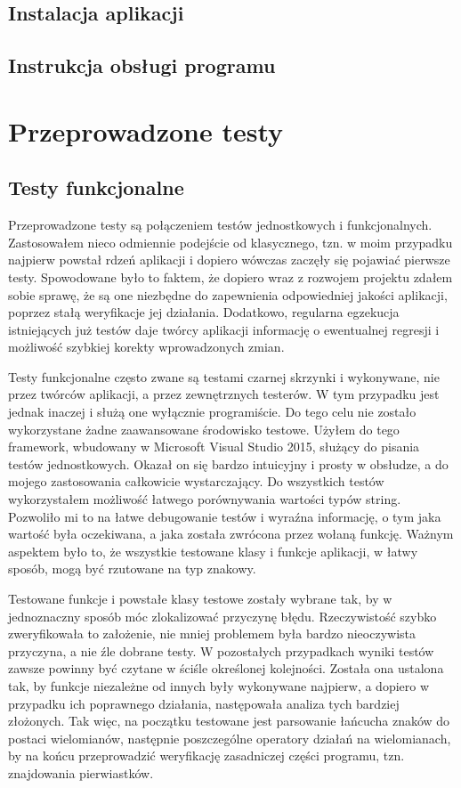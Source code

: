 \documentclass[twoside,a4paper]{book}
\begin{document}
\section{Instalacja aplikacji}

\section{Instrukcja obsługi programu}

\chapter{Przeprowadzone testy}

\section{Testy funkcjonalne}

Przeprowadzone testy są połączeniem testów jednostkowych i funkcjonalnych. Zastosowałem nieco odmiennie podejście od klasycznego, tzn. w moim przypadku najpierw powstał rdzeń aplikacji i dopiero wówczas zaczęły się pojawiać pierwsze testy. Spowodowane było to faktem, że dopiero wraz z rozwojem projektu zdałem sobie sprawę, że są one niezbędne do zapewnienia odpowiedniej jakości aplikacji, poprzez stałą weryfikacje jej działania. Dodatkowo, regularna egzekucja istniejących już testów daje twórcy aplikacji informację o ewentualnej regresji i możliwość szybkiej korekty wprowadzonych zmian.

Testy funkcjonalne często zwane są testami czarnej skrzynki i wykonywane, nie przez twórców aplikacji, a przez zewnętrznych testerów. W tym przypadku jest jednak inaczej i służą one wyłącznie programiście. Do tego celu nie zostało wykorzystane żadne zaawansowane środowisko testowe. Użyłem do tego framework, wbudowany w Microsoft Visual Studio 2015, służący do pisania testów jednostkowych. Okazał on się bardzo intuicyjny i prosty w obsłudze, a do mojego zastosowania całkowicie wystarczający. Do wszystkich testów wykorzystałem możliwość łatwego porównywania wartości typów string. Pozwoliło mi to na łatwe debugowanie testów i wyraźna informację, o tym jaka wartość była oczekiwana, a jaka została zwrócona przez wołaną funkcję. Ważnym aspektem było to, że wszystkie testowane klasy i funkcje aplikacji, w łatwy sposób, mogą być rzutowane na typ znakowy.

Testowane funkcje i powstałe klasy testowe zostały wybrane tak, by w jednoznaczny sposób móc zlokalizować przyczynę błędu. Rzeczywistość szybko zweryfikowała to założenie, nie mniej problemem była bardzo nieoczywista przyczyna, a nie źle dobrane testy. W pozostałych przypadkach wyniki testów zawsze powinny być czytane w ściśle określonej kolejności. Została ona ustalona tak, by funkcje niezależne od innych były wykonywane najpierw, a dopiero w przypadku ich poprawnego działania, następowała analiza tych bardziej złożonych. Tak więc, na początku testowane jest parsowanie łańcucha znaków do postaci wielomianów, następnie poszczególne operatory działań na wielomianach, by na końcu przeprowadzić weryfikację zasadniczej części programu, tzn. znajdowania pierwiastków.
\end{document}

